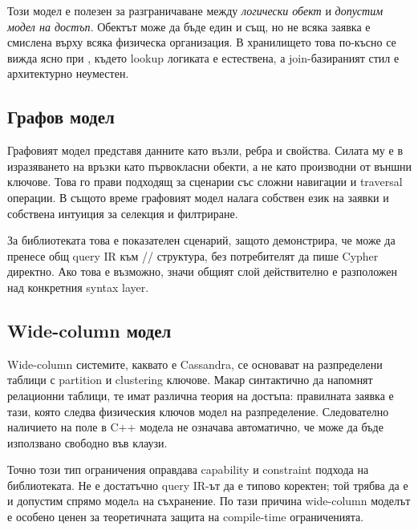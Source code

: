 Този модел е полезен за разграничаване между \emph{логически обект} и \emph{допустим модел на достъп}. Обектът може да бъде един и същ, но не всяка заявка е смислена върху всяка физическа организация. В хранилището това по-късно се вижда ясно при , където lookup логиката е естествена, а join-базираният стил е архитектурно неуместен.

\subsection{Графов модел}

Графовият модел представя данните като възли, ребра и свойства. Силата му е в изразяването на връзки като първокласни обекти, а не като производни от външни ключове. Това го прави подходящ за сценарии със сложни навигации и traversal операции. В същото време графовият модел налага собствен език на заявки и собствена интуиция за селекция и филтриране.

За библиотеката това е показателен сценарий, защото демонстрира, че  може да пренесе общ query IR към // структура, без потребителят да пише Cypher директно. Ако това е възможно, значи общият слой действително е разположен над конкретния syntax layer.

\subsection{Wide-column модел}

Wide-column системите, каквато е Cassandra, се основават на разпределени таблици с partition и clustering ключове. Макар синтактично да напомнят релационни таблици, те имат различна теория на достъпа: правилната заявка е тази, която следва физическия ключов модел на разпределение. Следователно наличието на поле в C++ модела не означава автоматично, че може да бъде използвано свободно във  клаузи.

Точно този тип ограничения оправдава capability и constraint подхода на библиотеката. Не е достатъчно query IR-ът да е типово коректен; той трябва да е и допустим спрямо моделa на съхранение. По тази причина wide-column моделът е особено ценен за теоретичната защита на compile-time ограниченията.

